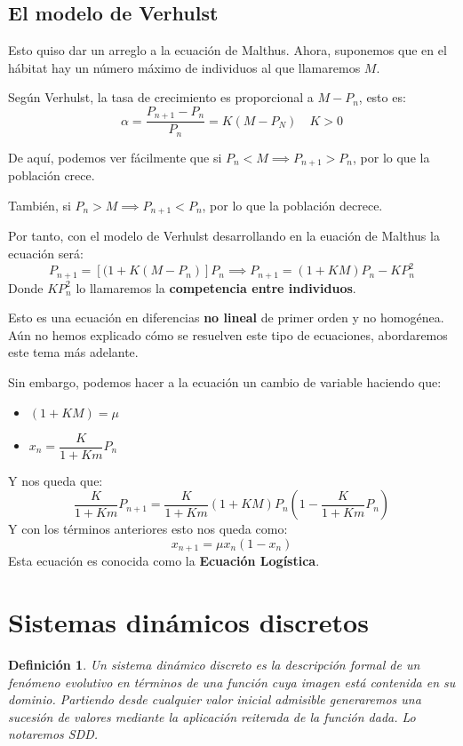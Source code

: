 \documentclass[11pt, a4paper, titlepage]{article}
\theoremstyle{theorem-style}
\theoremstyle{definition-style}
\newtheorem*{ndef}{Definición}
\theoremstyle{remark-style}
\theoremstyle{example-style}
\begin{document}
\subsection{El modelo de Verhulst}
Esto quiso dar un arreglo a la ecuación de Malthus. Ahora, suponemos que en el hábitat hay un número máximo de individuos al que llamaremos $M$.

Según Verhulst, la tasa de crecimiento es proporcional a $M-P_n$, esto es:
\[
\alpha = \dfrac{P_{n+1}-P_n}{P_n} = K (M-P_N) \quad K > 0
\]

De aquí, podemos ver fácilmente que si $P_n < M \implies P_{n+1} > P_n$, por lo que la población crece.

También, si $P_n > M \implies P_{n+1} < P_n$, por lo que la población decrece.

Por tanto, con el modelo de Verhulst desarrollando en la euación de Malthus la ecuación será:
\[
P_{n+1} = [(1+K(M-P_n)]P_n \implies P_{n+1} = (1+KM)P_n -KP_n^2
\]
Donde $KP_n^2$ lo llamaremos la \textbf{competencia entre individuos}.

Esto es una ecuación en diferencias \textbf{no lineal} de primer orden y no homogénea. Aún no hemos explicado cómo se resuelven este tipo de ecuaciones, abordaremos este tema más adelante.

Sin embargo, podemos hacer a la ecuación un cambio de variable haciendo que:
\begin{itemize}
	\item $(1+KM) = \mu$
	\item $x_n = \dfrac{K}{1+Km}P_n$
\end{itemize} 
Y nos queda que:
\[
\dfrac{K}{1+Km}P_{n+1} = \dfrac{K}{1+Km}(1+KM)P_n ( 1 - \dfrac{K}{1+Km}P_n)
\]
Y con los términos anteriores esto nos queda como:
\[
x_{n+1} = \mu x_n(1-x_n)
\]
Esta ecuación es conocida como la \textbf{Ecuación Logística}.

\section{Sistemas dinámicos discretos}

\begin{ndef}
	Un sistema dinámico discreto es la descripción formal de un fenómeno evolutivo en términos de una función cuya imagen está contenida en su dominio. Partiendo desde cualquier valor inicial admisible generaremos una sucesión de valores mediante la aplicación reiterada de la función dada. Lo notaremos SDD.
\end{ndef}
\end{document}
